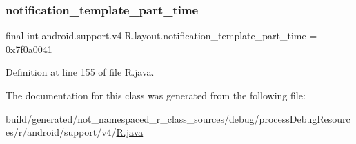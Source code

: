 \subsubsection{\texorpdfstring{notification\_template\_part\_time}{notification\_template\_part\_time}}
{\footnotesize\ttfamily final int android.\+support.\+v4.\+R.\+layout.\+notification\+\_\+template\+\_\+part\+\_\+time = 0x7f0a0041\hspace{0.3cm}{\ttfamily [static]}}



Definition at line 155 of file R.\+java.



The documentation for this class was generated from the following file\+:\begin{DoxyCompactItemize}
\item 
build/generated/not\+\_\+namespaced\+\_\+r\+\_\+class\+\_\+sources/debug/process\+Debug\+Resources/r/android/support/v4/\mbox{\hyperlink{android_2support_2v4_2_r_8java}{R.\+java}}\end{DoxyCompactItemize}
